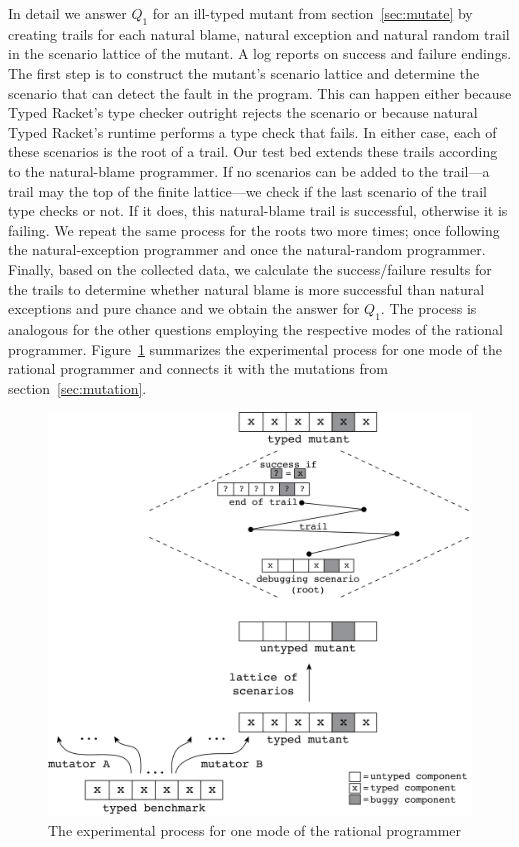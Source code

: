 In detail we answer $Q_1$ for an ill-typed mutant from
section~\ref{sec:mutate} by creating trails for each natural blame,
natural exception and natural random trail in the scenario lattice of the mutant. A
log reports on success and failure endings.  The first step is to construct the
mutant's scenario lattice and determine the scenario that can detect the fault in
the program. This can happen either because Typed Racket's type checker outright
rejects the scenario or because natural Typed Racket's runtime performs a type check
that fails. In either case, each of these scenarios is the root of a trail. Our test
bed extends these trails according to the natural-blame programmer.  If no scenarios
can be added to the trail---a trail may the top of the finite lattice---we check if
the last scenario of the trail type checks or not. If it does, this natural-blame
trail is successful, otherwise it is failing. We repeat the same process for the
roots two more times; once following the natural-exception programmer and once the
natural-random programmer. Finally, based on the collected data, we calculate the
success/failure results for the trails to determine whether natural blame is more
successful than natural exceptions and pure chance and we obtain the answer for
$Q_1$.  The process is analogous for the other questions employing the respective
modes of the rational programmer. Figure~\ref{fig:process} summarizes the
experimental process for one mode of the rational programmer and connects
it with the mutations from section~\ref{sec:mutation}.

\begin{figure}
  \centering
  \includegraphics[width=\textwidth]{./Images/process}
  \caption{The experimental process for one mode of the rational
  programmer}
  \label{fig:process}
\end{figure}


